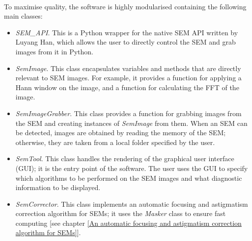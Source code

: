 \documentclass[12pt, twocolumn]{report}
\begin{document}
\paragraph{}
To maximise quality, the software is highly modularised containing the following main classes:
\begin{itemize}
    \item \textit{SEM\_API}. This is a Python wrapper for the native SEM API written by Luyang Han, which allows the user to directly control the SEM and grab images from it in Python.
    \item \textit{SemImage}. This class encapsulates variables and methods that are directly relevant to SEM images. For example, it provides a function for applying a Hann window on the image, and a function for calculating the FFT of the image.
    \item \textit{SemImageGrabber}. This class provides a function for grabbing images from the SEM and creating instances of \textit{SemImage} from them. When an SEM can be detected, images are obtained by reading the memory of the SEM; otherwise, they are taken from a local folder specified by the user.
    \item \textit{SemTool}. This class handles the rendering of the graphical user interface (GUI); it is the entry point of the software. The user uses the GUI to specify which algorithms to be performed on the SEM images and what diagnostic information to be displayed.
    \item \textit{SemCorrector}. This class implements an automatic focusing and astigmatism correction algorithm for SEMs; it uses the \textit{Masker} class to ensure fast computing [see chapter \ref{An automatic focusing and astigmatism correction algorithm for SEMs}].
\end{itemize}
\end{document}
